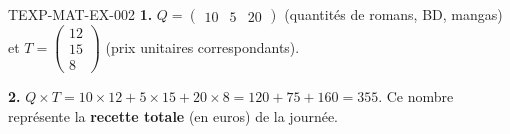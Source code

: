 \begin{corrige}{TEXP-MAT-EX-002}
\textbf{1.} $Q=\begin{pmatrix}10&5&20\end{pmatrix}$ (quantités de romans, BD, mangas) et $T=\begin{pmatrix}12\\15\\8\end{pmatrix}$ (prix unitaires correspondants).

\textbf{2.} $Q\times T=10\times12+5\times15+20\times8=120+75+160=355$. Ce nombre représente la \textbf{recette totale} (en euros) de la journée.
\end{corrige}
